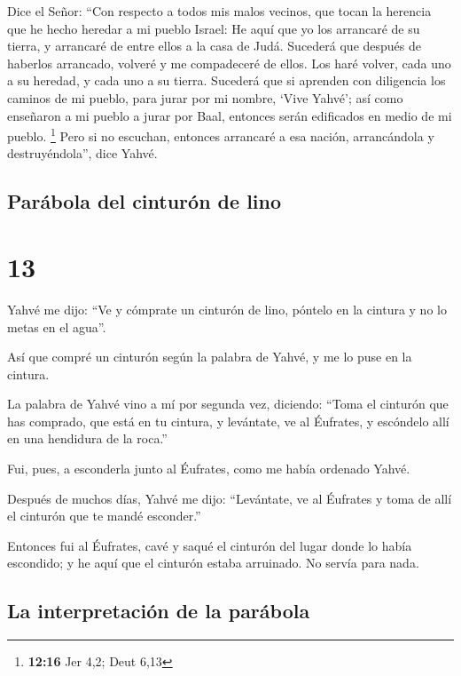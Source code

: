  Dice el Señor: ``Con respecto a todos mis malos vecinos,
que tocan la herencia que he hecho heredar a mi pueblo Israel: He aquí
que yo los arrancaré de su tierra, y arrancaré de entre ellos a la casa
de Judá.  Sucederá que después de haberlos arrancado,
volveré y me compadeceré de ellos. Los haré volver, cada uno a su
heredad, y cada uno a su tierra.  Sucederá que si
aprenden con diligencia los caminos de mi pueblo, para jurar por mi
nombre, `Vive Yahvé'; así como enseñaron a mi pueblo a jurar por Baal,
entonces serán edificados en medio de mi pueblo. \footnote{\textbf{12:16}
  Jer 4,2; Deut 6,13}  Pero si no escuchan, entonces
arrancaré a esa nación, arrancándola y destruyéndola'', dice Yahvé.

\hypertarget{paruxe1bola-del-cinturuxf3n-de-lino}{%
\subsection{Parábola del cinturón de
lino}\label{paruxe1bola-del-cinturuxf3n-de-lino}}

\hypertarget{section-12}{%
\section{13}\label{section-12}}

 Yahvé me dijo: ``Ve y cómprate un cinturón de lino,
póntelo en la cintura y no lo metas en el agua''.

 Así que compré un cinturón según la palabra de Yahvé, y
me lo puse en la cintura.

 La palabra de Yahvé vino a mí por segunda vez, diciendo:
 ``Toma el cinturón que has comprado, que está en tu
cintura, y levántate, ve al Éufrates, y escóndelo allí en una hendidura
de la roca.''

 Fui, pues, a esconderla junto al Éufrates, como me había
ordenado Yahvé.

 Después de muchos días, Yahvé me dijo: ``Levántate, ve al
Éufrates y toma de allí el cinturón que te mandé esconder.''

 Entonces fui al Éufrates, cavé y saqué el cinturón del
lugar donde lo había escondido; y he aquí que el cinturón estaba
arruinado. No servía para nada.

\hypertarget{la-interpretaciuxf3n-de-la-paruxe1bola}{%
\subsection{La interpretación de la
parábola}\label{la-interpretaciuxf3n-de-la-paruxe1bola}}

